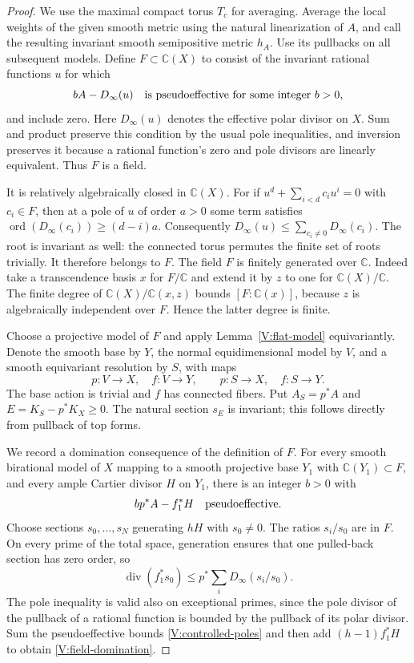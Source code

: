 \begin{proof}
We use the maximal compact torus $T_c$ for averaging.  Average the
local weights of the given smooth metric using the natural
linearization of $A$, and call the resulting invariant smooth
semipositive metric $h_A$.  Use its pullbacks on all subsequent models.
Define $F\subset\mathbb C(X)$ to consist of the invariant rational
functions $u$ for which
\begin{equation}\label{V:controlled-poles}
 bA-D_\infty(u)\quad\hbox{is pseudoeffective for some integer }b>0,
\end{equation}
and include zero.  Here $D_\infty(u)$ denotes the effective polar
divisor on $X$.  Sum and product preserve this condition by the
usual pole inequalities, and inversion preserves it because a
rational function's zero and pole divisors are linearly equivalent.
Thus $F$ is a field.

It is relatively algebraically closed in $\mathbb C(X)$.  For if
$u^d+\sum_{i<d}c_i u^i=0$ with $c_i\in F$, then at a pole of $u$
of order $a>0$ some term satisfies
$\operatorname{ord}(D_\infty(c_i))\ge(d-i)a$.  Consequently
$D_\infty(u)\le\sum_{c_i\ne0}D_\infty(c_i)$.
The root is invariant as well: the connected torus permutes the
finite set of roots trivially.  It therefore belongs to $F$.
The field $F$ is finitely generated over $\mathbb C$.  Indeed take
a transcendence basis $x$ for $F/\mathbb C$ and extend it by $z$ to
one for $\mathbb C(X)/\mathbb C$.  The finite degree of
$\mathbb C(X)/\mathbb C(x,z)$ bounds $[F:\mathbb C(x)]$, because
$z$ is algebraically independent over $F$.  Hence the latter degree
is finite.

Choose a projective model of $F$ and apply
Lemma~\ref{V:flat-model} equivariantly.  Denote the smooth base by
$Y$, the normal equidimensional model by $V$, and a smooth equivariant
resolution by $S$, with maps
\[
 p:V\to X,\quad f:V\to Y,
 \qquad p:S\to X,\quad f:S\to Y.
\]
The base action is trivial and $f$ has connected fibers.  Put
$A_S=p^*A$ and $E=K_S-p^*K_X\ge0$.  The natural section
$s_E$ is invariant; this follows directly from pullback of top forms.

We record a domination consequence of the definition of $F$.
For every smooth birational model of $X$ mapping to a smooth
projective base $Y_1$ with $\mathbb C(Y_1)\subset F$, and every ample
Cartier divisor $H$ on $Y_1$, there is an integer $b>0$ with
\begin{equation}\label{V:field-domination}
 b p^*A-f_1^*H\quad\hbox{pseudoeffective}.
\end{equation}
Choose sections $s_0,\ldots,s_N$ generating $hH$ with $s_0\ne0$.
The ratios $s_i/s_0$ are in $F$.  On every prime of the total space,
generation ensures that one pulled-back section has zero order, so
\[
 \operatorname{div}(f_1^*s_0)
 \le p^*\sum_iD_\infty(s_i/s_0).
\]
The pole inequality is valid also on exceptional primes, since the
pole divisor of the pullback of a rational function is bounded by
the pullback of its polar divisor.  Sum the pseudoeffective bounds
\eqref{V:controlled-poles} and then add $(h-1)f_1^*H$ to obtain
\eqref{V:field-domination}.


\end{proof}
